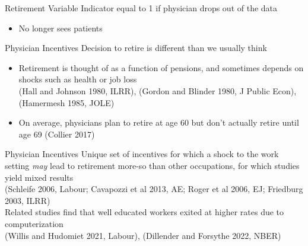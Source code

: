 \documentclass[10pt]{beamer}
\begin{document}
\begin{frame}{Retirement Variable}
Indicator equal to 1 if physician drops out of the data\\
                    \vspace{3mm}
\begin{itemize}
    \item No longer sees patients
\end{itemize}
\end{frame}

\begin{frame}{Physician Incentives}
Decision to retire is different than we usually think
                \vspace{3mm}
\begin{itemize}
    \item Retirement is thought of as a function of pensions, and sometimes depends on shocks such as health or job loss\\ \scriptsize{(Hall and Johnson 1980, ILRR), (Gordon and Blinder 1980, J Public Econ), (Hamermesh 1985, JOLE)}
                \vspace{3mm}
                \normalsize
    \item On average, physicians plan to retire at age 60 but don't actually retire until age 69 \scriptsize{(Collier 2017)}
\end{itemize}
\end{frame}

\begin{frame}{Physician Incentives}
Unique set of incentives for which a shock to the work setting \textit{may} lead to retirement more-so than other occupations, for which studies yield mixed results\\
\scriptsize{(Schleife 2006, Labour; Cavapozzi et al 2013, AE; Roger et al 2006, EJ; Friedburg 2003, ILRR)}\\
                \vspace{15mm}
                \normalsize
Related studies find that well educated workers exited at higher rates due to computerization\\
\scriptsize (Willis and Hudomiet 2021, Labour), (Dillender and Forsythe 2022, NBER)
\end{frame}
\end{document}
